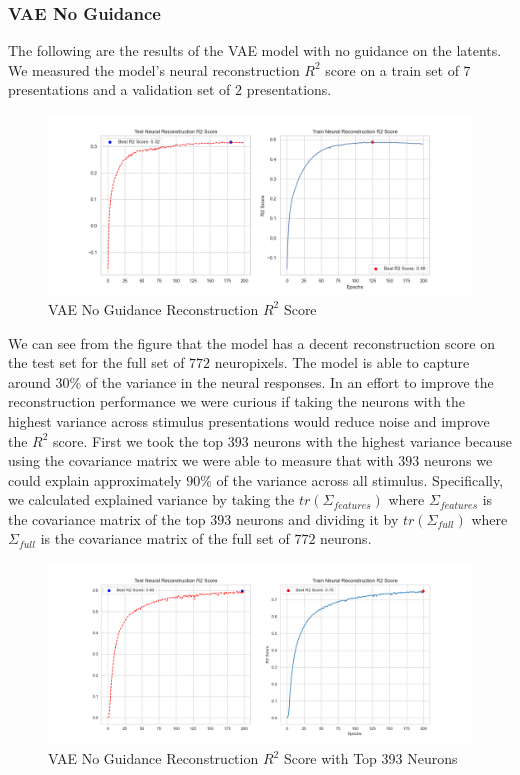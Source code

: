 \documentclass[12pt, letterpaper]{article}
\begin{document}
\subsubsection{VAE No Guidance}
\label{subsubsec:vae_no_guidance}
The following are the results of the VAE model with no guidance on the latents. We measured the model's neural reconstruction $R^2$ score on a train set of $7$ presentations and a validation set of $2$ presentations.

\begin{figure}[H]
    \centering
    \includegraphics[width=1.0\textwidth]{x_r2_128dim_200_epochs_0.05beta_2_layer.png}
    \caption{VAE No Guidance Reconstruction $R^2$ Score}
    \label{fig:vae_no_guidance}
\end{figure}

We can see from the figure that the model has a decent reconstruction score on the test set for the full set of $772$ neuropixels. The model is able to capture around $30\%$ of the variance in the neural responses. In an effort to improve the reconstruction performance we were curious if taking the neurons with the highest variance across stimulus presentations would reduce noise and improve the $R^2$ score. First we took the top $393$ neurons with the highest variance because using the covariance matrix we were able to measure that with $393$ neurons we could explain approximately $90\%$ of the variance across all stimulus. Specifically, we calculated explained variance by taking the $tr(\Sigma_{features})$ where $\Sigma_{features}$ is the covariance matrix of the top $393$ neurons and dividing it by $tr(\Sigma_{full})$ where $\Sigma_{full}$ is the covariance matrix of the full set of $772$ neurons. 

\begin{figure}[H]
    \centering
    \includegraphics[width=1.0\textwidth]{x_r2_128dim_393_top_var_200_epochs_0.05_beta_2_layer.png}
    \caption{VAE No Guidance Reconstruction $R^2$ Score with Top 393 Neurons}
    \label{fig:vae_no_guidance_top393}
\end{figure}
\end{document}
